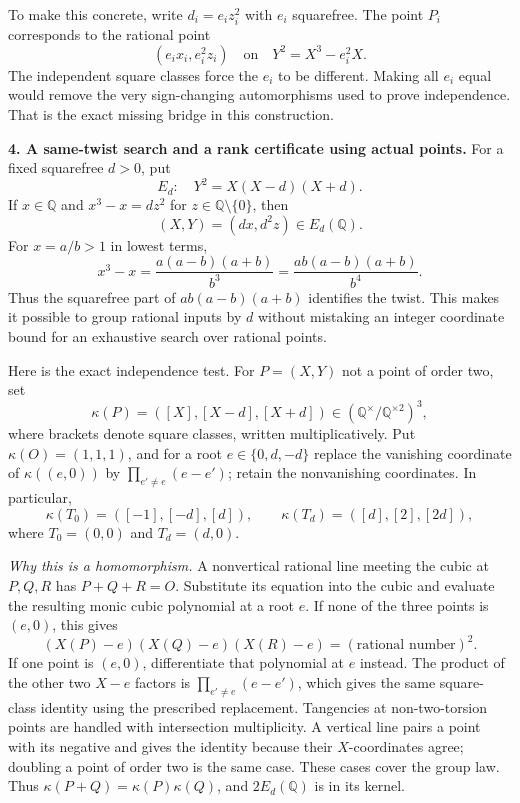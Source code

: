 \documentclass[11pt,a4paper]{article}
\newcommand{\Q}{\mathbb{Q}}
\numberwithin{equation}{section}
\begin{document}
To make this concrete, write $d_i=e_i z_i^2$ with $e_i$ squarefree.
The point $P_i$ corresponds to the rational point
\[
 (e_ix_i,e_i^2z_i)\quad\text{on}\quad
 Y^2=X^3-e_i^2X.
\]
The independent square classes force the $e_i$ to be different. Making all
$e_i$ equal would remove the very sign-changing automorphisms used to prove
independence. That is the exact missing bridge in this construction.

\medskip
\textbf{4. A same-twist search and a rank certificate using actual points.}
For a fixed squarefree $d>0$, put
\[
 E_d:\quad Y^2=X(X-d)(X+d).
\]
If $x\in\Q$ and $x^3-x=dz^2$ for $z\in\Q\setminus\{0\}$, then
\begin{equation}\label{30006731:point}
 (X,Y)=(dx,d^2z)\in E_d(\Q).
\end{equation}
For $x=a/b>1$ in lowest terms,
\[
 x^3-x=\frac{a(a-b)(a+b)}{b^3}
       =\frac{ab(a-b)(a+b)}{b^4}.
\]
Thus the squarefree part of $ab(a-b)(a+b)$ identifies the twist. This makes
it possible to group rational inputs by $d$ without mistaking an integer
coordinate bound for an exhaustive search over rational points.

Here is the exact independence test. For $P=(X,Y)$ not a point of order two,
set
\[
 \kappa(P)=([X],[X-d],[X+d])
 \in(\Q^\times/\Q^{\times2})^3,
\]
where brackets denote square classes, written multiplicatively. Put
$\kappa(O)=(1,1,1)$, and for a root $e\in\{0,d,-d\}$ replace the vanishing
coordinate of $\kappa((e,0))$ by
$\prod_{e'\neq e}(e-e')$; retain the nonvanishing coordinates. In particular,
\begin{equation}\label{30006731:torsion}
 \kappa(T_0)=([-1],[-d],[d]),\qquad
 \kappa(T_d)=([d],[2],[2d]),
\end{equation}
where $T_0=(0,0)$ and $T_d=(d,0)$.

\emph{Why this is a homomorphism.} A nonvertical rational line meeting the
cubic at $P,Q,R$ has $P+Q+R=O$. Substitute its equation into the cubic and
evaluate the resulting monic cubic polynomial at a root $e$. If none of
the three points is $(e,0)$, this gives
\[
 (X(P)-e)(X(Q)-e)(X(R)-e)=(\text{rational number})^2.
\]
If one point is $(e,0)$, differentiate that polynomial at $e$ instead. The
product of the other two $X-e$ factors is
$\prod_{e'\neq e}(e-e')$, which gives the same square-class identity using
the prescribed replacement. Tangencies at non-two-torsion points are handled
with intersection multiplicity. A vertical line pairs a point with its
negative and gives the identity because their $X$-coordinates agree; doubling
a point of order two is the same case. These cases cover the group law.
Thus $\kappa(P+Q)=\kappa(P)\kappa(Q)$, and $2E_d(\Q)$ is in its kernel.
\end{document}
